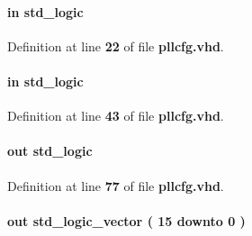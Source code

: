 \paragraph[{mimo\+\_\+en}]{ {\bfseries \textcolor{keywordflow}{in}\textcolor{vhdlchar}{ }} {\bfseries \textcolor{comment}{std\+\_\+logic}\textcolor{vhdlchar}{ }} \hspace{0.3cm}{\ttfamily [Port]}}\label{classpllcfg_a0c57670aee4f9fbfa3c286573012965a}


Definition at line {\bf 22} of file {\bf pllcfg.\+vhd}.

\paragraph[{mreset}]{ {\bfseries \textcolor{keywordflow}{in}\textcolor{vhdlchar}{ }} {\bfseries \textcolor{comment}{std\+\_\+logic}\textcolor{vhdlchar}{ }} \hspace{0.3cm}{\ttfamily [Port]}}\label{classpllcfg_a3f01f53cfe06b99a7bfa97b24503f39b}


Definition at line {\bf 43} of file {\bf pllcfg.\+vhd}.

\paragraph[{n\+\_\+byp}]{ {\bfseries \textcolor{keywordflow}{out}\textcolor{vhdlchar}{ }} {\bfseries \textcolor{comment}{std\+\_\+logic}\textcolor{vhdlchar}{ }} \hspace{0.3cm}{\ttfamily [Port]}}\label{classpllcfg_ac572b94a01e09b2e460da498000609a4}


Definition at line {\bf 77} of file {\bf pllcfg.\+vhd}.

\paragraph[{n\+\_\+cnt}]{ {\bfseries \textcolor{keywordflow}{out}\textcolor{vhdlchar}{ }} {\bfseries \textcolor{comment}{std\+\_\+logic\+\_\+vector}\textcolor{vhdlchar}{ }\textcolor{vhdlchar}{(}\textcolor{vhdlchar}{ }\textcolor{vhdlchar}{ } \textcolor{vhdldigit}{15} \textcolor{vhdlchar}{ }\textcolor{keywordflow}{downto}\textcolor{vhdlchar}{ }\textcolor{vhdlchar}{ } \textcolor{vhdldigit}{0} \textcolor{vhdlchar}{ }\textcolor{vhdlchar}{)}\textcolor{vhdlchar}{ }} \hspace{0.3cm}{\ttfamily [Port]}}\label{classpllcfg_ae04a3e022a002b92cb4bbb3d2bbefe39}


